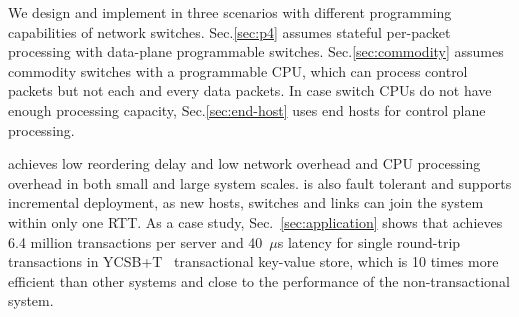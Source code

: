 

We design and implement \sys in three scenarios with different programming capabilities of network switches. Sec.\ref{sec:p4} assumes stateful per-packet processing with data-plane programmable switches. Sec.\ref{sec:commodity} assumes commodity switches with a programmable CPU, which can process control packets but not each and every data packets. In case switch CPUs do not have enough processing capacity, Sec.\ref{sec:end-host} uses end hosts for control plane processing.

\sys achieves low reordering delay and low network overhead and CPU processing overhead in both small and large system scales. \sys is also fault tolerant and supports incremental deployment, as new hosts, switches and links can join the system within only one RTT. As a case study, Sec.~\ref{sec:application} shows that \sys achieves 6.4 million transactions per server and 40~$\mu$s latency for single round-trip transactions in YCSB+T~\cite{dey2014ycsbt} transactional key-value store, which is 10 times more efficient than other systems and close to the performance of the non-transactional system.

